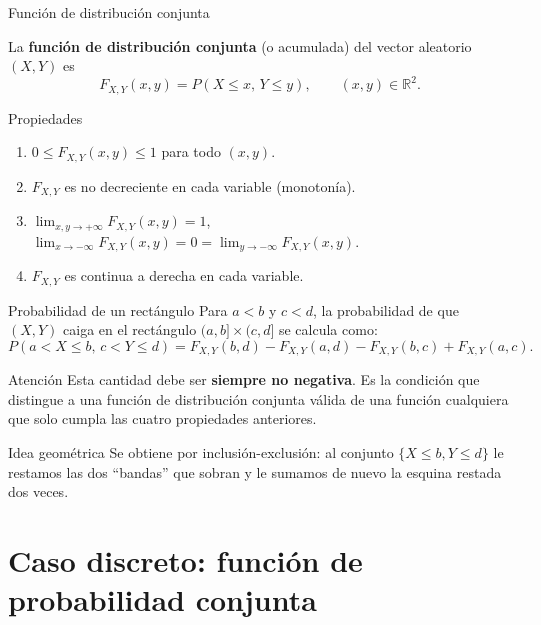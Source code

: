 \documentclass[aspectratio=169,11pt]{beamer}
\begin{document}
\begin{frame}{Función de distribución conjunta}
\begin{definition}
La \textbf{función de distribución conjunta} (o acumulada) del vector aleatorio $(X,Y)$ es
\[
F_{X,Y}(x,y) = P(X \le x, \, Y \le y), \qquad (x,y) \in \mathbb{R}^2.
\]
\end{definition}
\pause
\begin{block}{Propiedades}
\begin{enumerate}
\item $0 \le F_{X,Y}(x,y) \le 1$ para todo $(x,y)$.
\item $F_{X,Y}$ es no decreciente en cada variable (monotonía).
\item $\displaystyle\lim_{x,y \to +\infty} F_{X,Y}(x,y) = 1$, \quad $\displaystyle\lim_{x \to -\infty} F_{X,Y}(x,y) = 0 = \lim_{y \to -\infty} F_{X,Y}(x,y)$.
\item $F_{X,Y}$ es continua a derecha en cada variable.
\end{enumerate}
\end{block}
\end{frame}

\begin{frame}{Probabilidad de un rectángulo}
Para $a < b$ y $c < d$, la probabilidad de que $(X,Y)$ caiga en el rectángulo $(a,b] \times (c,d]$ se calcula como:
\[
P(a < X \le b, \, c < Y \le d) = F_{X,Y}(b,d) - F_{X,Y}(a,d) - F_{X,Y}(b,c) + F_{X,Y}(a,c).
\]
\begin{alertblock}{Atención}
Esta cantidad debe ser \textbf{siempre no negativa}. Es la condición que distingue a una función de distribución conjunta válida de una función cualquiera que solo cumpla las cuatro propiedades anteriores.
\end{alertblock}
\pause
\begin{block}{Idea geométrica}
Se obtiene por inclusión-exclusión: al conjunto $\{X\le b, Y\le d\}$ le restamos las dos ``bandas'' que sobran y le sumamos de nuevo la esquina restada dos veces.
\end{block}
\end{frame}

\section{Caso discreto: función de probabilidad conjunta}
\end{document}
